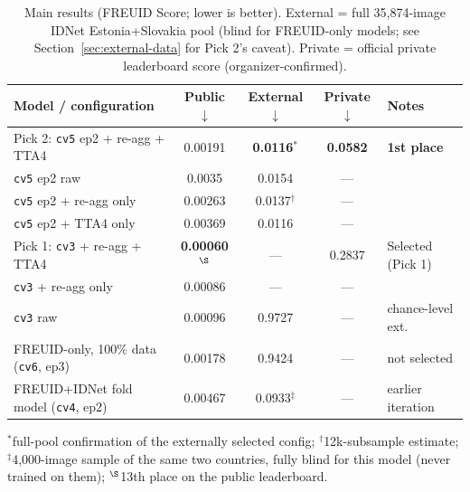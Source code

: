 \documentclass[11pt,a4paper]{article}
\begin{document}
\begin{table}[H]
  \centering
  \caption{Main results (FREUID Score; lower is better). External = full
  35{,}874-image IDNet Estonia+Slovakia pool (blind for FREUID-only models;
  see Section~\ref{sec:external-data} for Pick 2's caveat). Private = official
  private leaderboard score (organizer-confirmed).}
  \label{tab:results}
  \small
  \setlength{\tabcolsep}{4.5pt}
  \begin{tabular}{lcccl}
    \toprule
    Model / configuration & Public $\downarrow$ & External $\downarrow$ & Private $\downarrow$ & Notes \\
    \midrule
    Pick 2: \texttt{cv5} ep2 + re-agg + TTA4  & 0.00191 & \textbf{0.0116}$^{*}$ & \textbf{0.0582} & \textbf{1st place} \\
    \quad \texttt{cv5} ep2 raw                & 0.0035  & 0.0154 & --- & \\
    \quad \texttt{cv5} ep2 + re-agg only       & 0.00263 & 0.0137$^{\dagger}$ & --- & \\
    \quad \texttt{cv5} ep2 + TTA4 only         & 0.00369 & 0.0116 & --- & \\
    Pick 1: \texttt{cv3} + re-agg + TTA4       & \textbf{0.00060}$^{\S}$ & --- & 0.2837 & Selected (Pick 1) \\
    \quad \texttt{cv3} + re-agg only           & 0.00086 & ---    & --- & \\
    \quad \texttt{cv3} raw                     & 0.00096 & 0.9727 & --- & chance-level ext. \\
    FREUID-only, 100\% data (\texttt{cv6}, ep3) & 0.00178 & 0.9424 & --- & not selected \\
    FREUID+IDNet fold model (\texttt{cv4}, ep2) & 0.00467 & 0.0933$^{\ddagger}$ & --- & earlier iteration \\
    \bottomrule
  \end{tabular}
  \normalsize

  \vspace{2pt}
  {\footnotesize $^{*}$full-pool confirmation of the externally selected config;
  $^{\dagger}$12k-subsample estimate; $^{\ddagger}$4{,}000-image sample of the
  same two countries, fully blind for this model (never trained on them);
  $^{\S}$13th place on the public leaderboard.}
\end{table}
\end{document}
